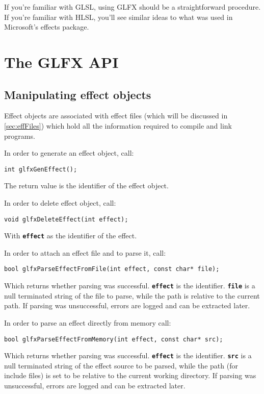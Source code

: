 \documentclass[11pt,a4paper,final,titlepage]{article}
\let\orgautoref\autoref
\renewcommand{\autoref}{%
\def\sectionautorefname{Sec.}%
\def\subsectionautorefname{Sec.}%
\def\algocflineautorefname{Alg.}%
\def\lemmaautorefname{Lemma}%
\orgautoref}
\begin{document}
If you're familiar with GLSL, using GLFX should be a straightforward procedure. If you're familiar
with HLSL, you'll see similar ideas to what was used in Microsoft's effects package.

\pagebreak
\section{The GLFX API}

\subsection{Manipulating effect objects}
Effect objects are associated with effect files (which will be discussed in \autoref{sec:effFiles})
which hold all the information required to compile and link programs.

In order to generate an effect object, call:
\begin{lstlisting}
int glfxGenEffect();
\end{lstlisting}
The return value is the identifier of the effect object.

In order to delete effect object, call:
\begin{lstlisting}
void glfxDeleteEffect(int effect);
\end{lstlisting}
With \texttt{\textbf{effect}} as the identifier of the effect.

In order to attach an effect file and to parse it, call:
\begin{lstlisting}
bool glfxParseEffectFromFile(int effect, const char* file);
\end{lstlisting}
Which returns whether parsing was successful. \texttt{\textbf{effect}} is the identifier.
\texttt{\textbf{file}} is a null terminated string of the file to parse, while the path is relative
to the current path. If parsing was unsuccessful, errors are logged and can be extracted later.

In order to parse an effect directly from memory call:
\begin{lstlisting}
bool glfxParseEffectFromMemory(int effect, const char* src);
\end{lstlisting}
Which returns whether parsing was successful. \texttt{\textbf{effect}} is the identifier.
\texttt{\textbf{src}} is a null terminated string of the effect source to be parsed,
while the path (for include files) is set to be relative to the current working directory.
If parsing was unsuccessful, errors are logged and can be extracted later.
\end{document}
